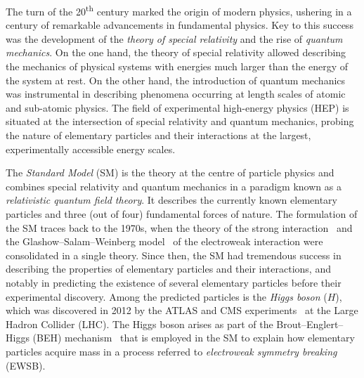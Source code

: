 The turn of the 20\textsuperscript{th} century marked the origin of modern
physics, ushering in a century of remarkable advancements in fundamental
physics. Key to this success was the development of the \emph{theory of special
  relativity} and the rise of \emph{quantum mechanics}. On the one hand, the
theory of special relativity
%
allowed describing the mechanics of physical systems with energies much larger
than the energy of the system at rest. On the other hand, the introduction of
quantum mechanics was instrumental in describing phenomena occurring at length
scales of atomic and sub-atomic physics. The field of experimental high-energy
physics (HEP) is situated at the intersection of special relativity and quantum
mechanics, probing the nature of elementary particles and their interactions at
the largest, experimentally accessible energy scales.



The \emph{Standard Model} (SM) is the theory at the centre of particle physics
and combines special relativity and quantum mechanics in a paradigm known as a
\emph{relativistic quantum field theory}. It describes the currently known
elementary particles and three (out of four) fundamental forces of nature. The
formulation of the SM traces back to the 1970s, when the theory of the strong
interaction~\cite{Fritzsch:1973pi,Gross:1973id,Politzer:1973fx} and the
Glashow--Salam--Weinberg
model~\cite{Glashow:1961tr,Salam:1964ry,Weinberg:1967tq} of the electroweak
interaction were consolidated in a single theory. Since then, the SM had
tremendous success in describing the properties of elementary particles and
their interactions, and notably in predicting the existence of several
elementary particles before their experimental discovery. Among the predicted
particles is the \emph{Higgs boson} ($H$), which was discovered in 2012 by the
ATLAS and CMS experiments~\cite{HIGG-2012-27,CMS-HIG-12-028} at the Large Hadron
Collider (LHC). The Higgs boson arises as part of the Brout--Englert--Higgs
(BEH) mechanism~\cite{Englert:1964et,Higgs:1964pj} that is employed in the SM to
explain how elementary particles acquire mass in a process referred to
\emph{electroweak symmetry breaking} (EWSB).


